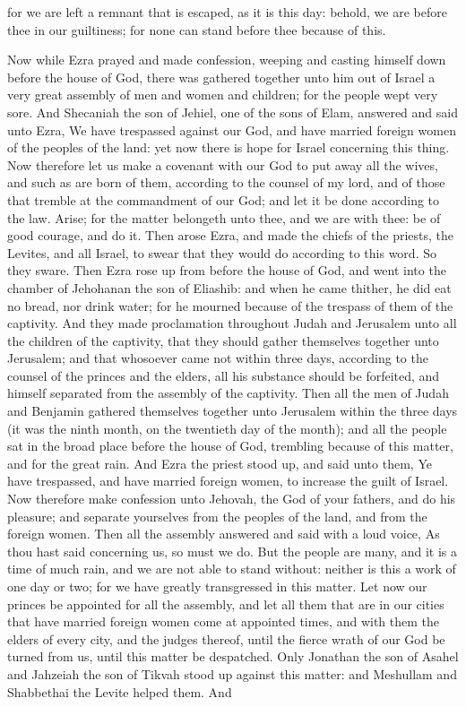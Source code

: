 for we are left a remnant that is escaped, as it is this day: behold, we are before thee in our guiltiness; for none can stand before thee because of this. 

Now while Ezra prayed and made confession, weeping and casting himself down before the house of God, there was gathered together unto him out of Israel a very great assembly of men and women and children; for the people wept very sore. And Shecaniah the son of Jehiel, one of the sons of Elam, answered and said unto Ezra, We have trespassed against our God, and have married foreign women of the peoples of the land: yet now there is hope for Israel concerning this thing. Now therefore let us make a covenant with our God to put away all the wives, and such as are born of them, according to the counsel of my lord, and of those that tremble at the commandment of our God; and let it be done according to the law. Arise; for the matter belongeth unto thee, and we are with thee: be of good courage, and do it.  Then arose Ezra, and made the chiefs of the priests, the Levites, and all Israel, to swear that they would do according to this word. So they sware. Then Ezra rose up from before the house of God, and went into the chamber of Jehohanan the son of Eliashib: and when he came thither, he did eat no bread, nor drink water; for he mourned because of the trespass of them of the captivity. And they made proclamation throughout Judah and Jerusalem unto all the children of the captivity, that they should gather themselves together unto Jerusalem; and that whosoever came not within three days, according to the counsel of the princes and the elders, all his substance should be forfeited, and himself separated from the assembly of the captivity.  Then all the men of Judah and Benjamin gathered themselves together unto Jerusalem within the three days (it was the ninth month, on the twentieth day of the month); and all the people sat in the broad place before the house of God, trembling because of this matter, and for the great rain. And Ezra the priest stood up, and said unto them, Ye have trespassed, and have married foreign women, to increase the guilt of Israel. Now therefore make confession unto Jehovah, the God of your fathers, and do his pleasure; and separate yourselves from the peoples of the land, and from the foreign women. Then all the assembly answered and said with a loud voice, As thou hast said concerning us, so must we do. But the people are many, and it is a time of much rain, and we are not able to stand without: neither is this a work of one day or two; for we have greatly transgressed in this matter. Let now our princes be appointed for all the assembly, and let all them that are in our cities that have married foreign women come at appointed times, and with them the elders of every city, and the judges thereof, until the fierce wrath of our God be turned from us, until this matter be despatched. Only Jonathan the son of Asahel and Jahzeiah the son of Tikvah stood up against this matter: and Meshullam and Shabbethai the Levite helped them.  And 
